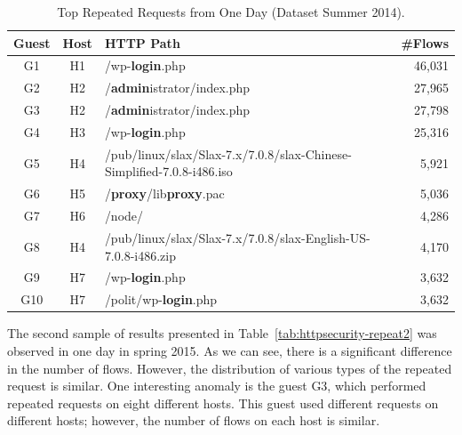\begin{table}[ht]
\centering
\begin{tabular}{| c | c | l | r|} \hline
Guest & Host & HTTP Path & \#Flows \\ \hline
G1  & H1 &                 /wp-\textbf{login}.php & 46,031 \\ \hline
G2  & H2 &      /\textbf{admin}istrator/index.php & 27,965 \\ \hline
G3  & H2 &      /\textbf{admin}istrator/index.php & 27,798 \\ \hline
G4  & H3 &                 /wp-\textbf{login}.php & 25,316 \\ \hline
G5  & H4 & \parbox[t]{5cm}{/pub/linux/slax/Slax-7.x/7.0.8/slax-Chinese-Simplified-7.0.8-i486.iso} & 5,921 \\ \hline
G6  & H5 &           /\textbf{proxy}/lib\textbf{proxy}.pac & 5,036 \\ \hline
G7  & H6 &                        /node/ & 4,286 \\ \hline
G8  & H4 & \parbox[t]{5cm}{/pub/linux/slax/Slax-7.x/7.0.8/slax-English-US-7.0.8-i486.zip} & 4,170 \\ \hline
G9  & H7 &                 /wp-\textbf{login}.php & 3,632 \\ \hline
G10 & H7 &           /polit/wp-\textbf{login}.php & 3,632 \\ \hline
\end{tabular}
\caption{Top Repeated Requests from One Day (Dataset Summer 2014).}
\label{tab:httpsecurity-repeat}
\end{table}

The second sample of results presented in Table~\ref{tab:httpsecurity-repeat2} was observed in one day in spring 2015. As we can see, there is a significant difference in the number of flows. However, the distribution of various types of the repeated request is similar. One interesting anomaly is the guest G3, which performed repeated requests on eight different hosts. This guest used different requests on different hosts; however, the number of flows on each host is similar.

